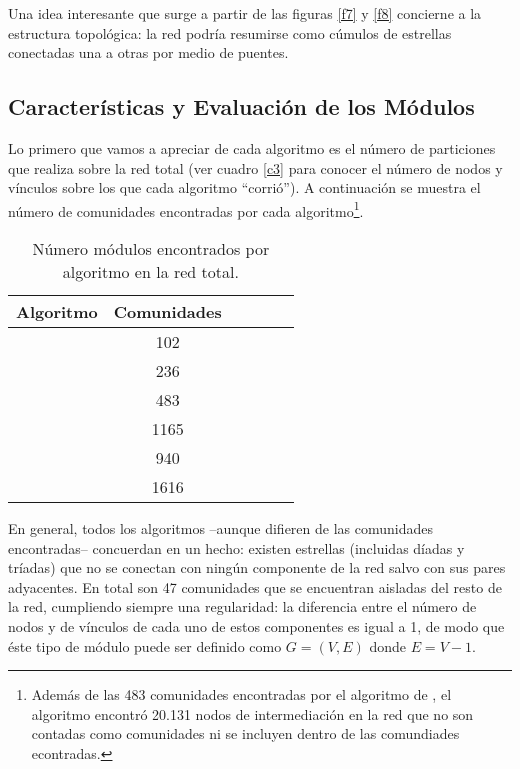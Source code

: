 \documentclass[12pt,letter]{article}
\begin{document}
\vspace{0.5cm}
Una idea interesante que surge a partir de las figuras \ref{f7} y \ref{f8} concierne a la estructura topológica: la red podría resumirse como cúmulos de estrellas conectadas una a otras por medio de puentes.

\subsection{Características y Evaluación de los Módulos}
Lo primero que vamos a apreciar de cada algoritmo es el número de particiones que realiza sobre la red total (ver cuadro \ref{c3} para conocer el número de nodos y vínculos sobre los que cada algoritmo ``corrió''). A continuación se muestra el número de comunidades encontradas por cada algoritmo\footnote{Además de las 483 comunidades encontradas por el algoritmo de \cite{Girvan1, Girvan2}, el algoritmo encontró 20.131 nodos de intermediación en la red que no son contadas como comunidades ni se incluyen dentro de las comundiades econtradas.}.

\begin{table}[h!]
\centering
\begin{tabular}{cccccc}
\textbf{Algoritmo} & \textbf{Comunidades} \\ \hline 
   \cite{Blondel} & 102  \\
   \cite{Clauset} &  236 \\
   \cite{Girvan1, Girvan2}  & 483\\
    \cite{Pons}  & 1165 & \\
    \cite{Raghavan}  & 940\\
    \cite{Rosvall1} & 1616 \\ \hline
\end{tabular}
\caption{\small{Número módulos encontrados por algoritmo en la red total}.}
\label{c5}
\end{table}

En general, todos los algoritmos --aunque difieren de las comunidades encontradas-- concuerdan en un hecho: existen estrellas (incluidas díadas y tríadas) que no se conectan con ningún componente de la red salvo con sus pares adyacentes.  En total son 47 comunidades que se encuentran aisladas del resto de la red, cumpliendo siempre una regularidad: la diferencia entre el número de nodos y de vínculos de cada uno de estos componentes es igual a 1, de modo que éste tipo de módulo puede ser definido como $G=(V,E)$ donde $E=V-1$.

\vspace{0.5cm}
\end{document}
